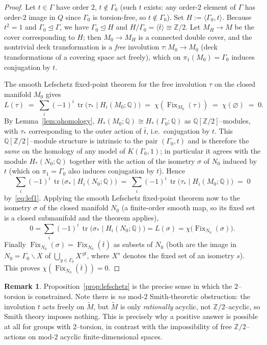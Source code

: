 \documentclass[12pt]{article}
\newcommand{\bQ}{\mathbb{Q}}
\newcommand{\bZ}{\mathbb{Z}}
\newcommand{\Fix}{\operatorname{Fix}}
\DeclareMathOperator{\tr}{tr}
\theoremstyle{definition}
\newtheorem{remark}{Remark}
\begin{document}
\begin{proof}
Let $t\in\Gamma$ have order $2$, $t\notin\Gamma_0$ (such $t$ exists: any order-$2$
element of $\Gamma$ has order-$2$ image in $Q$ since $\Gamma_0$ is torsion-free,
so $t\notin\Gamma_0$).  Set $H:=\langle\Gamma_0,t\rangle$.  Because $t^2=1$ and
$\Gamma_0\trianglelefteq\Gamma$, we have $\Gamma_0\trianglelefteq H$ and
$H/\Gamma_0=\langle\bar t\rangle\cong\bZ/2$.  Let $M_H\to M$ be the cover
corresponding to $H$; then $M_0\to M_H$ is a connected double cover, and the
nontrivial deck transformation is a \emph{free} involution
$\tau\colon M_0\to M_0$ (deck transformations of a covering space act freely),
which on $\pi_1(M_0)=\Gamma_0$ induces conjugation by $t$.

The smooth Lefschetz fixed-point theorem for the free involution $\tau$ on the
closed manifold $M_0$ gives
\begin{equation}\label{eq:lef1}
   L(\tau)\;=\;\sum_i(-1)^i\,\tr\bigl(\tau_*\mid H_i(M_0;\bQ)\bigr)
            \;=\;\chi(\Fix_{M_0}(\tau))\;=\;\chi(\varnothing)\;=\;0 .
\end{equation}
By Lemma~\ref{lem:qhomology}, $H_*(M_0;\bQ)\cong H_*(\Gamma_0;\bQ)$ as
$\bQ[\bZ/2]$--modules, with $\tau_*$ corresponding to the outer action of
$\bar t$, i.e.\ conjugation by $t$.  This $\bQ[\bZ/2]$--module structure is
intrinsic to the pair $(\Gamma_0,t)$ and is therefore the \emph{same} on the
homology of any model of $K(\Gamma_0,1)$; in particular it agrees with the module
$H_*(N_0;\bQ)$ together with the action of the isometry $\sigma$ of $N_0$ induced
by $t$ (which on $\pi_1=\Gamma_0$ also induces conjugation by $t$).  Hence
\[
   \sum_i(-1)^i\,\tr\bigl(\sigma_*\mid H_i(N_0;\bQ)\bigr)
   \;=\;\sum_i(-1)^i\,\tr\bigl(\tau_*\mid H_i(M_0;\bQ)\bigr)\;=\;0
\]
by~\eqref{eq:lef1}.  Applying the smooth Lefschetz fixed-point theorem now to the
isometry $\sigma$ of the closed manifold $N_0$ (a finite-order smooth map, so its
fixed set is a closed submanifold and the theorem applies),
\[
   0=\sum_i(-1)^i\,\tr\bigl(\sigma_*\mid H_i(N_0;\bQ)\bigr)
    =L(\sigma)=\chi\bigl(\Fix_{N_0}(\sigma)\bigr) .
\]
Finally $\Fix_{N_0}(\sigma)=\Fix_{N_0}(\bar t)$ as subsets of $N_0$ (both are the
image in $N_0=\Gamma_0\backslash X$ of $\bigcup_{g\in\Gamma_0}X^{\,gt}$, where
$X^{s}$ denotes the fixed set of an isometry $s$).  This proves
$\chi(\Fix_{N_0}(\bar t))=0$.
\end{proof}

\begin{remark}\label{rem:nosmith}
Proposition~\ref{prop:lefschetz} is the precise sense in which the $2$--torsion is
constrained.  Note there is \emph{no} mod-$2$ Smith-theoretic obstruction:
the involution $t$ acts freely on $\widetilde M$, but $\widetilde M$ is only
\emph{rationally} acyclic, not $\bZ/2$--acyclic, so Smith theory imposes nothing.
This is precisely why a positive answer is possible at all for groups with
$2$--torsion, in contrast with the impossibility of free $\bZ/2$--actions on
mod-$2$ acyclic finite-dimensional spaces.
\end{remark}
\end{document}
